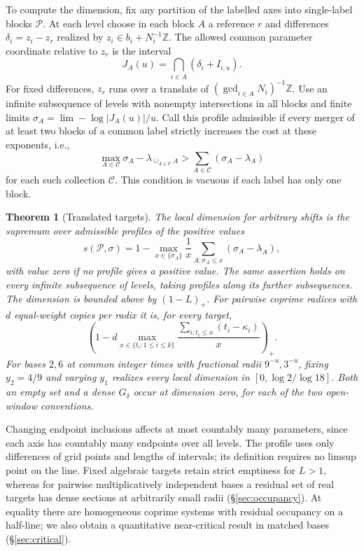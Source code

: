 \documentclass[11pt,reqno,a4paper]{amsart}
\newtheorem{theorem}{Theorem}[section]
\theoremstyle{remark}
\numberwithin{equation}{section}
\begin{document}
To compute the dimension, fix any partition of the labelled axes into single-label blocks \(\mathcal P\). At each level choose in each block \(A\) a reference \(r\) and differences \(\delta_i=z_i-z_r\) realized by \(z_i\in b_i+N_i^{-1}\mathbb Z\). The allowed common parameter coordinate relative to \(z_r\) is the interval
\[
 J_A(u)=\bigcap_{i\in A}(\delta_i+I_{i,u}).
\]
For fixed differences, \(z_r\) runs over a translate of \((\gcd_{i\in A}N_i)^{-1}\mathbb Z\). Use an infinite subsequence of levels with nonempty intersections in all blocks and finite limits \(\sigma_A=\lim -\log |J_A(u)|/u\). Call this profile admissible if every merger of at least two blocks of a common label strictly increases the cost at these exponents, i.e.,
\[
 \max_{A\in\mathcal C}\sigma_A-\lambda_{\cup_{A\in\mathcal C}A}
     >\sum_{A\in\mathcal C}(\sigma_A-\lambda_A)
\]
for each such collection \(\mathcal C\). This condition is vacuous if each label has only one block.

\begin{theorem}[Translated targets]\label{thm:profile}
The local dimension for arbitrary shifts is the supremum over admissible profiles of the positive values
\[
 s(\mathcal P,\sigma)=1-
 \max_{x\in\{\sigma_A\}}\frac1x
           \sum_{A:\sigma_A\le x}(\sigma_A-\lambda_A),
\]
with value zero if no profile gives a positive value. The same assertion holds on every infinite subsequence of levels, taking profiles along its further subsequences. The dimension is bounded above by \((1-L)_+\).
For pairwise coprime radices with \(d\) equal-weight copies per radix it is, for every target,
\[
 \left(1-d\max_{x\in\{t_i:1\le i\le k\}}
          \frac{\sum_{i:t_i\le x}(t_i-\kappa_i)}{x}\right)_+ .
\]
For bases \(2,6\) at common integer times with fractional radii \(9^{-u},3^{-u}\), fixing \(y_2=4/9\) and varying \(y_1\) realizes every local dimension in \([0,\log2/\log18]\). Both an empty set and a dense \(G_\delta\) occur at dimension zero, for each of the two open-window conventions.
\end{theorem}

Changing endpoint inclusions affects at most countably many parameters, since each axis has countably many endpoints over all levels. The profile uses only differences of grid points and lengths of intervals; its definition requires no limsup point on the line. Fixed algebraic targets retain strict emptiness for \(L>1\), whereas for pairwise multiplicatively independent bases a residual set of real targets has dense sections at arbitrarily small radii (\S\ref{sec:occupancy}). At equality there are homogeneous coprime systems with residual occupancy on a half-line; we also obtain a quantitative near-critical result in matched bases (\S\ref{sec:critical}).
\end{document}
